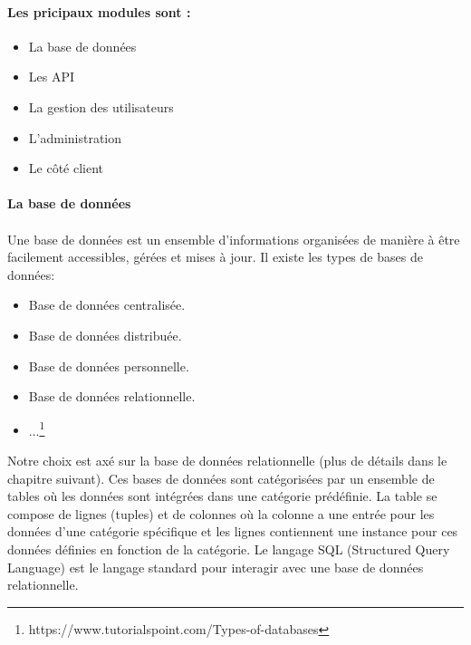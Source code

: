                 \paragraph{Les pricipaux modules sont :}
                \begin{itemize}
                        \item La base de données
                        \item Les API
                        \item La gestion des utilisateurs
                        \item L'administration
                        \item Le côté client
                \end{itemize}
                \paragraph{La base de données}
                \paragraph{}
                Une base de données est un ensemble d'informations organisées de manière 
                à être facilement accessibles, gérées et mises à jour. Il existe les types de bases de données:
                \begin{itemize}
                        \item Base de données centralisée.
                        \item Base de données distribuée.
                        \item Base de données personnelle.
                        \item Base de données relationnelle.
                        \item ...\footnote{https://www.tutorialspoint.com/Types-of-databases}
                \end{itemize}
                Notre choix est axé sur la base de données relationnelle (plus de détails dans le chapitre suivant).
                Ces bases de données sont catégorisées par un ensemble de tables où les données 
                sont intégrées dans une catégorie prédéfinie. La table se compose de lignes (tuples)
                et de colonnes où la colonne a une entrée pour les données d'une catégorie spécifique 
                et les lignes contiennent une instance pour ces données définies en fonction de la catégorie. 
                Le langage SQL (Structured Query Language) est le langage standard pour interagir avec
                 une base de données relationnelle.
